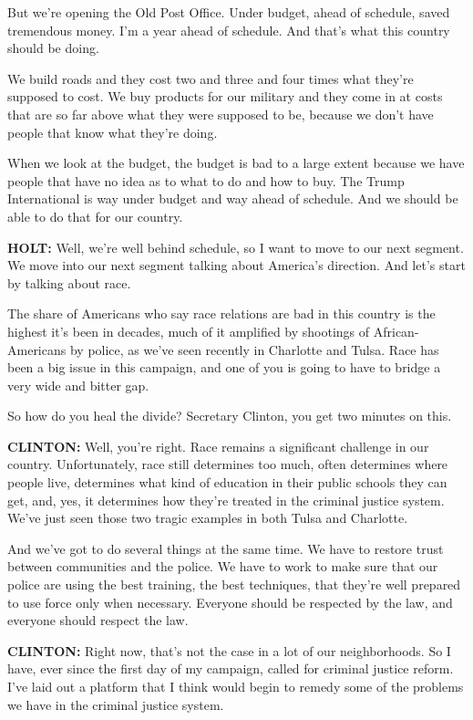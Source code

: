 But we're opening the Old Post Office. Under budget, ahead of schedule,
saved tremendous money. I'm a year ahead of schedule. And that's what
this country should be doing.

We build roads and they cost two and three and four times what they're
supposed to cost. We buy products for our military and they come in at
costs that are so far above what they were supposed to be, because we
don't have people that know what they're doing.

When we look at the budget, the budget is bad to a large extent because
we have people that have no idea as to what to do and how to buy. The
Trump International is way under budget and way ahead of schedule. And
we should be able to do that for our country.

\textbf{HOLT:} Well, we're well behind schedule, so I want to move to
our next segment. We move into our next segment talking about America's
direction. And let's start by talking about race.

The share of Americans who say race relations are bad in this country is
the highest it's been in decades, much of it amplified by shootings of
African-Americans by police, as we've seen recently in Charlotte and
Tulsa. Race has been a big issue in this campaign, and one of you is
going to have to bridge a very wide and bitter gap.

So how do you heal the divide? Secretary Clinton, you get two minutes on
this.

\textbf{CLINTON:} Well, you're right. Race remains a significant
challenge in our country. Unfortunately, race still determines too much,
often determines where people live, determines what kind of education in
their public schools they can get, and, yes, it determines how they're
treated in the criminal justice system. We've just seen those two tragic
examples in both Tulsa and Charlotte.

And we've got to do several things at the same time. We have to restore
trust between communities and the police. We have to work to make sure
that our police are using the best training, the best techniques, that
they're well prepared to use force only when necessary. Everyone should
be respected by the law, and everyone should respect the law.

\textbf{CLINTON:} Right now, that's not the case in a lot of our
neighborhoods. So I have, ever since the first day of my campaign,
called for criminal justice reform. I've laid out a platform that I
think would begin to remedy some of the problems we have in the criminal
justice system.

